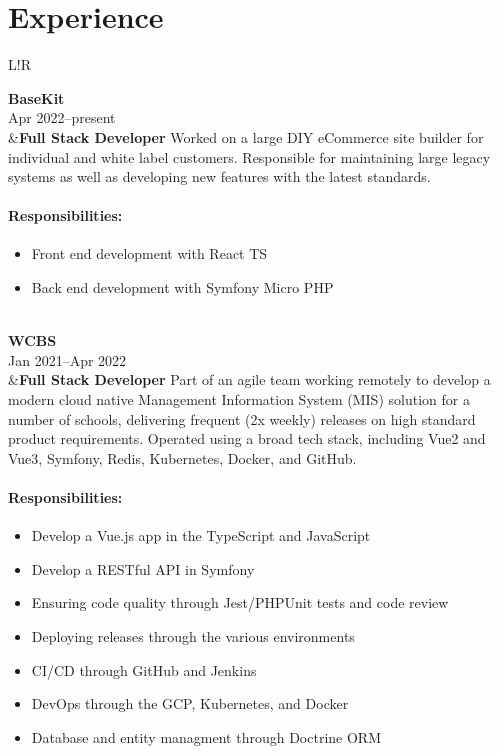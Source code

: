 \documentclass[10pt]{article}
\newcommand\VRule{\color{lightgray}\vrule width 0.5pt}
\begin{document}
\section*{Experience}
\begin{longtable}{L!{\VRule}R}

{\bf BaseKit}\\
Apr 2022--present\\
&{\bf Full Stack Developer}\newline
Worked on a large DIY eCommerce site builder for individual and white label customers. Responsible for maintaining large legacy systems as well as developing new features with the latest standards.

\vspace{-3mm}
\paragraph{Responsibilities:}
\begin{itemize}[noitemsep,topsep=0pt]
    \item Front end development with React TS
    \item Back end development with Symfony Micro PHP
\end{itemize}
\\

{\bf WCBS}\\
Jan 2021--Apr 2022\\
&{\bf Full Stack Developer}\newline
Part of an agile team working remotely to develop a modern cloud native Management Information System (MIS) solution for a number of schools, delivering frequent (2x weekly) releases on high standard product requirements. Operated using a broad tech stack, including Vue2 and Vue3, Symfony, Redis, Kubernetes, Docker, and GitHub.

\vspace{-3mm}
\paragraph{Responsibilities:}
\begin{itemize}[noitemsep,topsep=0pt]
	\item Develop a Vue.js app in the TypeScript and JavaScript
	\item Develop a RESTful API in Symfony
	\item Ensuring code quality through Jest/PHPUnit tests and code review
	\item Deploying releases through the various environments
	\item CI/CD through GitHub and Jenkins
	\item DevOps through the GCP, Kubernetes, and Docker
	\item Database and entity managment through Doctrine ORM
\end{itemize}
\\


\end{longtable}
\end{document}
